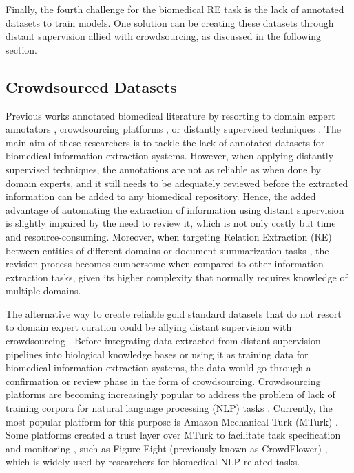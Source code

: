 Finally, the fourth challenge for the biomedical RE task is the lack of annotated datasets to train models. One solution can be creating these datasets through distant supervision allied with crowdsourcing, as discussed in the following section. 

\subsection{Crowdsourced Datasets}

 Previous works annotated biomedical literature by resorting to domain expert annotators \citep{herrero2013ddi}, crowdsourcing platforms \citep{tsueng2020applying}, or distantly supervised techniques \citep{sousa2019silver}. The main aim of these researchers is to tackle the lack of annotated datasets for biomedical information extraction systems. However, when applying distantly supervised techniques, the annotations are not as reliable as when done by domain experts, and it still needs to be adequately reviewed before the extracted information can be added to any biomedical repository. Hence, the added advantage of automating the extraction of information using distant supervision is slightly impaired by the need to review it, which is not only costly but time and resource-consuming.  Moreover, when targeting Relation Extraction (RE) between entities of different domains or document summarization tasks \citep{narayan2018ranking}, the revision process becomes cumbersome when compared to other information extraction tasks, given its higher complexity that normally requires knowledge of multiple domains. 

The alternative way to create reliable gold standard datasets that do not resort to domain expert curation could
be allying distant supervision with crowdsourcing \citep{gormley2010non,liu2016effective,collovini2018annotating}.
Before integrating data extracted from distant supervision pipelines into biological knowledge bases or using it
as training data for biomedical information extraction systems, the data would go through a confirmation or review
phase in the form of crowdsourcing. Crowdsourcing platforms are becoming increasingly popular to address the
problem of lack of training corpora for natural language processing (NLP) tasks \citep{callison2010creating}.
Currently, the most popular platform for this purpose is Amazon Mechanical Turk (MTurk)
\citep{ipeirotis2010quality,yetisgen2010preliminary,khare2015scaling}. Some platforms created a trust layer over
MTurk to facilitate task specification and monitoring \citep{wang2013perspectives}, such as Figure Eight
(previously known as CrowdFlower) \citep{li2016crowdsourcing,feyisetan2015towards}, which is widely used by
researchers for biomedical NLP related tasks.

